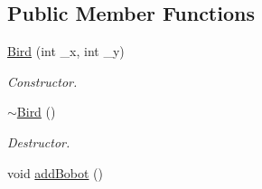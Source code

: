 \subsection*{Public Member Functions}
\begin{DoxyCompactItemize}
\item 
\hyperlink{classBird_a802e609916df32347f8b2d535647c232}{Bird} (int \-\_\-x, int \-\_\-y)
\begin{DoxyCompactList}\small\item\em Constructor. \end{DoxyCompactList}\item 
\hypertarget{classBird_a7d10693b91a2736611c37f1ef205b911}{\hyperlink{classBird_a7d10693b91a2736611c37f1ef205b911}{$\sim$\-Bird} ()}\label{classBird_a7d10693b91a2736611c37f1ef205b911}

\begin{DoxyCompactList}\small\item\em Destructor. \end{DoxyCompactList}\item 
\hypertarget{classBird_a43377def001a07e9a94f15559f82abd3}{void \hyperlink{classBird_a43377def001a07e9a94f15559f82abd3}{add\-Bobot} ()}\label{classBird_a43377def001a07e9a94f15559f82abd3}


\end{DoxyCompactItemize}
